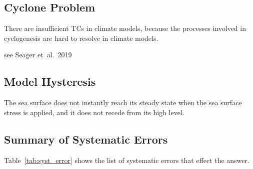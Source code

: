 \subsection{Cyclone Problem}
There are insufficient TCs in climate models, because the processes involved
in cyclogenesis are hard to resolve in climate models.

see Seager et~al.~2019~\cite{seager2019strengthening}

\subsection{Model Hysteresis}
The sea surface does not instantly reach its steady state when the sea surface
stress is applied, and it does not recede from its high level.


\subsection{Summary of Systematic Errors}
\label{sec:sys-errors}
Table~\ref{tab:syst_error} shows the list of systematic errors that effect the
answer.


